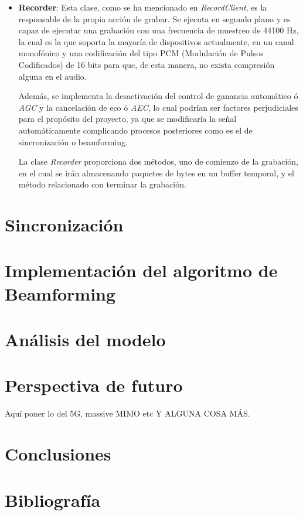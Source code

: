 \documentclass[a4paper,11pt]{book}
\begin{document}
\begin{itemize}
	\item \textbf{Recorder}: Esta clase, como se ha mencionado en \textit{RecordClient}, es la responsable de la propia acción de grabar. Se ejecuta en segundo plano y es capaz de ejecutar una grabación con una frecuencia de muestreo de 44100 Hz, la cual es la que soporta la mayoría de dispositivos actualmente, en un canal monofónico y una codificación del tipo PCM (Modulación de Pulsos Codificados) de 16 bits para que, de esta manera, no exista compresión alguna en el audio.
	
	Además, se implementa la desactivación del control de ganancia automático ó \textit{AGC} y la cancelación de eco ó \textit{AEC}, lo cual podrían ser factores perjudiciales para el propósito del proyecto, ya que se modificaría la señal automáticamente complicando procesos posteriores como es el de sincronización o beamforming.
	
	La clase \textit{Recorder} proporciona dos métodos, uno de comienzo de la grabación, en el cual se irán almacenando paquetes de bytes en un buffer temporal, y el método relacionado con terminar la grabación.
	\end{itemize}
	
	
	
\chapter{Sincronización}

\chapter{Implementación del algoritmo de Beamforming}

\chapter{Análisis del modelo}

\chapter{Perspectiva de futuro}
Aquí poner lo del 5G, massive MIMO etc Y ALGUNA COSA MÁS.
\chapter{Conclusiones}

\chapter{Bibliografía}
\end{document}

